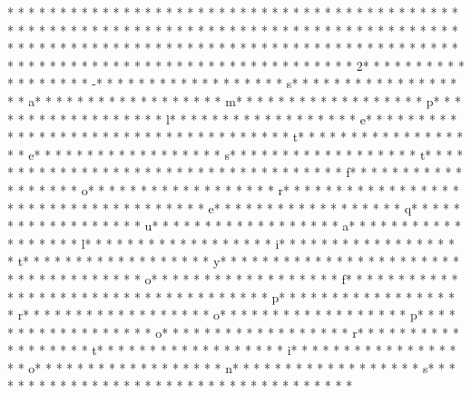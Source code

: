 * * *  * * *  * * *  *  * * *  *  * * *  *  * * *  * * *  * * *  *  * * *  *  * * *  *  * * *  * * *  * * *  *  * * *  *  * * *  *  * * *  * * *  * * *  *  * * *  *  * * *  *  * * *  * * *  * * *  *  * * *  *  * * *  *  * * *  * * *  * * *  *  * * *  *  * * *  *  * * *  * * *  * * *  *  * * *  *  * * *  *  * * *  * * *  * * *  *  * * *  *  * * *  *  * * *  * * *  * * *  *  * * *  *  * * *  * 2* * *  * * *  * * *  *  * * *  *  * * *  * -* * *  * * *  * * *  *  * * *  *  * * *  * s* * *  * * *  * * *  *  * * *  *  * * *  * a* * *  * * *  * * *  *  * * *  *  * * *  * m* * *  * * *  * * *  *  * * *  *  * * *  * p* * *  * * *  * * *  *  * * *  *  * * *  * l* * *  * * *  * * *  *  * * *  *  * * *  * e* * *  * * *  * * *  *  * * *  *  * * *  *  * * *  * * *  * * *  *  * * *  *  * * *  * t* * *  * * *  * * *  *  * * *  *  * * *  * e* * *  * * *  * * *  *  * * *  *  * * *  * s* * *  * * *  * * *  *  * * *  *  * * *  * t* * *  * * *  * * *  *  * * *  *  * * *  *  * * *  * * *  * * *  *  * * *  *  * * *  * f* * *  * * *  * * *  *  * * *  *  * * *  * o* * *  * * *  * * *  *  * * *  *  * * *  * r* * *  * * *  * * *  *  * * *  *  * * *  *  * * *  * * *  * * *  *  * * *  *  * * *  * e* * *  * * *  * * *  *  * * *  *  * * *  * q* * *  * * *  * * *  *  * * *  *  * * *  * u* * *  * * *  * * *  *  * * *  *  * * *  * a* * *  * * *  * * *  *  * * *  *  * * *  * l* * *  * * *  * * *  *  * * *  *  * * *  * i* * *  * * *  * * *  *  * * *  *  * * *  * t* * *  * * *  * * *  *  * * *  *  * * *  * y* * *  * * *  * * *  *  * * *  *  * * *  *  * * *  * * *  * * *  *  * * *  *  * * *  * o* * *  * * *  * * *  *  * * *  *  * * *  * f* * *  * * *  * * *  *  * * *  *  * * *  *  * * *  * * *  * * *  *  * * *  *  * * *  * p* * *  * * *  * * *  *  * * *  *  * * *  * r* * *  * * *  * * *  *  * * *  *  * * *  * o* * *  * * *  * * *  *  * * *  *  * * *  * p* * *  * * *  * * *  *  * * *  *  * * *  * o* * *  * * *  * * *  *  * * *  *  * * *  * r* * *  * * *  * * *  *  * * *  *  * * *  * t* * *  * * *  * * *  *  * * *  *  * * *  * i* * *  * * *  * * *  *  * * *  *  * * *  * o* * *  * * *  * * *  *  * * *  *  * * *  * n* * *  * * *  * * *  *  * * *  *  * * *  * s* * *  * * *  * * *  *  * * *  *  * * *  * 
* * *  * * *  * * *  *  * * *  *  * * *  * 
